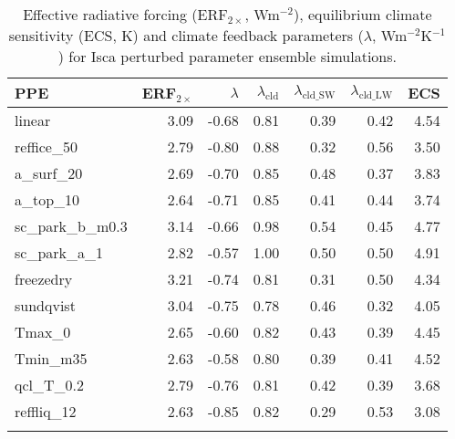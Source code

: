  \begin{table}[ht]
	\caption{Effective radiative forcing (ERF$_{2\times}$, Wm$^{-2}$), equilibrium climate sensitivity (ECS, K) and climate feedback parameters ($\lambda$, Wm$^{-2}$K$^{-1}$) for Isca perturbed parameter ensemble simulations.}
	\centering
	\small
	\vspace{0.5em}
	\renewcommand{\arraystretch}{1.2}
    \begin{tabular}{lrrrrrr}
    \toprule
    {PPE} &  ERF$_{2\times}$ &  $\lambda$ &  $\lambda_{\mathrm{cld}}$ &  $\lambda_{\mathrm{cld\_SW}}$ &  $\lambda_{\mathrm{cld\_LW}}$ &  ECS \\
    \midrule
    linear         &    3.09 &   -0.68 &        0.81 &           0.39 &           0.42 & 4.54 \\
    reffice\_50     &    2.79 &   -0.80 &        0.88 &           0.32 &           0.56 & 3.50 \\
    a\_surf\_20      &    2.69 &   -0.70 &        0.85 &           0.48 &           0.37 & 3.83 \\
    a\_top\_10       &    2.64 &   -0.71 &        0.85 &           0.41 &           0.44 & 3.74 \\
    sc\_park\_b\_m0.3 &    3.14 &   -0.66 &        0.98 &           0.54 &           0.45 & 4.77 \\
    sc\_park\_a\_1    &    2.82 &   -0.57 &        1.00 &           0.50 &           0.50 & 4.91 \\
    freezedry      &    3.21 &   -0.74 &        0.81 &           0.31 &           0.50 & 4.34 \\
    sundqvist      &    3.04 &   -0.75 &        0.78 &           0.46 &           0.32 & 4.05 \\
    Tmax\_0         &    2.65 &   -0.60 &        0.82 &           0.43 &           0.39 & 4.45 \\
    Tmin\_m35       &    2.63 &   -0.58 &        0.80 &           0.39 &           0.41 & 4.52 \\
    qcl\_T\_0.2      &    2.79 &   -0.76 &        0.81 &           0.42 &           0.39 & 3.68 \\
    reffliq\_12     &    2.63 &   -0.85 &        0.82 &           0.29 &           0.53 & 3.08 \\
    \bottomrule
    \label{tab:ECS_forcing_feedback}
    \end{tabular}
\end{table}

